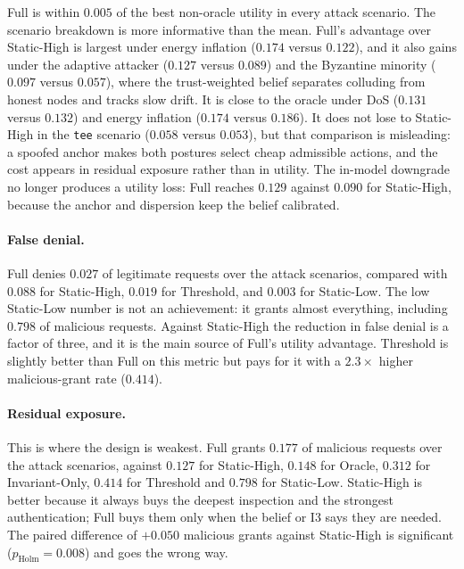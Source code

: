 Full is within $0.005$ of the best non-oracle utility in every attack scenario.
The scenario breakdown is more informative than the mean. Full's advantage over
Static-High is largest under energy inflation ($0.174$ versus $0.122$), and it
also gains under the adaptive attacker ($0.127$ versus $0.089$) and the Byzantine
minority ($0.097$ versus $0.057$), where the trust-weighted belief separates
colluding from honest nodes and tracks slow drift. It is close to the oracle under
DoS ($0.131$ versus $0.132$) and energy inflation ($0.174$ versus $0.186$). It
does not lose to Static-High in the \texttt{tee} scenario ($0.058$ versus
$0.053$), but that comparison is misleading: a spoofed anchor makes both postures
select cheap admissible actions, and the cost appears in residual exposure rather
than in utility. The in-model
downgrade no longer produces a utility loss: Full reaches $0.129$ against $0.090$
for Static-High, because the anchor and dispersion keep the belief calibrated.

\paragraph{False denial.} Full denies $0.027$ of legitimate requests over the
attack scenarios, compared with $0.088$ for Static-High, $0.019$ for Threshold,
and $0.003$ for Static-Low. The low Static-Low number is not an achievement: it
grants almost everything, including $0.798$ of malicious requests. Against
Static-High the reduction in false denial is a factor of three, and it is the
main source of Full's utility advantage. Threshold is slightly better than Full on
this metric but pays for it with a $2.3\times$ higher malicious-grant rate
($0.414$).

\paragraph{Residual exposure.} This is where the design is weakest. Full grants
$0.177$ of malicious requests over the attack scenarios, against $0.127$ for
Static-High, $0.148$ for Oracle, $0.312$ for Invariant-Only, $0.414$ for Threshold
and $0.798$ for Static-Low. Static-High is better because it always buys the
deepest inspection and the strongest authentication; Full buys them only when the
belief or I3 says they are needed. The paired difference of $+0.050$ malicious
grants against Static-High is significant ($p_{\text{Holm}}=0.008$) and goes the
wrong way.


